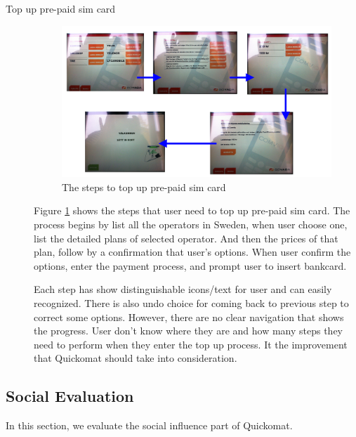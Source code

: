 \documentclass[twocolumn]{article}
\begin{document}
\begin{description}
  \item[Top up pre-paid sim card]
    \begin{figure}
      \centering
      \includegraphics[width=.8\textwidth]{fig/top-up-prepaid-sim-card.png}
      \caption{The steps to top up pre-paid sim card}
      \label{fig:top-up-prepaid-sim-card}
    \end{figure}
    Figure \ref{fig:top-up-prepaid-sim-card} shows the steps that user need to top up pre-paid sim card. The process begins by list all the operators in Sweden, when user choose one, list the detailed plans of selected operator. And then the prices of that plan, follow by a confirmation that user’s options. When user confirm the options, enter the payment process, and prompt user to insert bankcard.

    Each step has show distinguishable icons/text for user and can easily recognized. There is also undo choice for coming back to previous step to correct some options. However, there are no clear navigation that shows the progress. User don’t know where they are and how many steps they need to perform when they enter the top up process. It the improvement that Quickomat should take into consideration.
\end{description}

\subsection{Social Evaluation}
\label{sec:case-study-social-evaluation}
In this section, we evaluate the social influence part of Quickomat.
\end{document}
